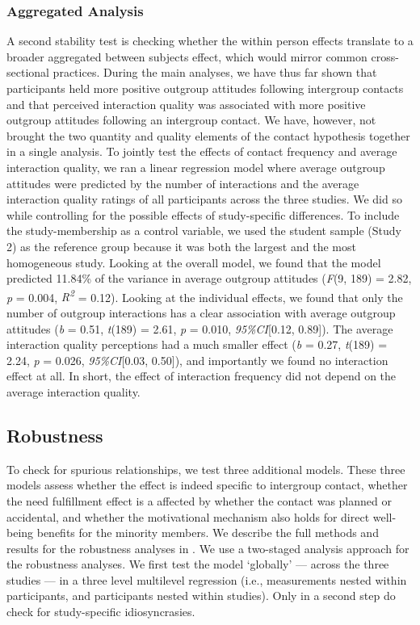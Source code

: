 \subsubsection{Aggregated Analysis}

A second stability test is checking whether the within person effects
translate to a broader aggregated between subjects effect, which would
mirror common cross-sectional practices. During the main analyses, we
have thus far shown that participants held more positive outgroup
attitudes following intergroup contacts and that perceived interaction
quality was associated with more positive outgroup attitudes following
an intergroup contact. We have, however, not brought the two quantity
and quality elements of the contact hypothesis together in a single
analysis. To jointly test the effects of contact frequency and average
interaction quality, we ran a linear regression model where average
outgroup attitudes were predicted by the number of interactions and the
average interaction quality ratings of all participants across the three
studies. We did so while controlling for the possible effects of
study-specific differences. To include the study-membership as a control
variable, we used the student sample (Study 2) as the reference group
because it was both the largest and the most homogeneous study. Looking
at the overall model, we found that the model predicted 11.84\% of the
variance in average outgroup attitudes (\textit{F}(9, 189) = 2.82,
\textit{p} = 0.004, \textit{R\textsuperscript{2}} = 0.12). Looking at
the individual effects, we found that only the number of outgroup
interactions has a clear association with average outgroup attitudes
(\textit{b} = 0.51, \textit{t}(189) = 2.61, \textit{p} = 0.010,
\textit{95\%CI}{[}0.12, 0.89{]}). The average interaction quality
perceptions had a much smaller effect (\textit{b} = 0.27,
\textit{t}(189) = 2.24, \textit{p} = 0.026, \textit{95\%CI}{[}0.03,
0.50{]}), and importantly we found no interaction effect at all. In
short, the effect of interaction frequency did not depend on the average
interaction quality.

\subsection{Robustness}

To check for spurious relationships, we test three additional models.
These three models assess whether the effect is indeed specific to
intergroup contact, whether the need fulfillment effect is a affected by
whether the contact was planned or accidental, and whether the
motivational mechanism also holds for direct well-being benefits for the
minority members. We describe the full methods and results for the
robustness analyses in . We use a
two-staged analysis approach for the robustness analyses. We first test
the model `globally' --- across the three studies --- in a three level
multilevel regression (i.e., measurements nested within participants,
and participants nested within studies). Only in a second step do check
for study-specific idiosyncrasies.

